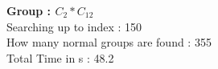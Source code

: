 \textbf{Group : $C_2*C_{12}$}\\
Searching up to index : 150\\
How many normal groups are found : 355\\
Total Time in s : 48.2\\
